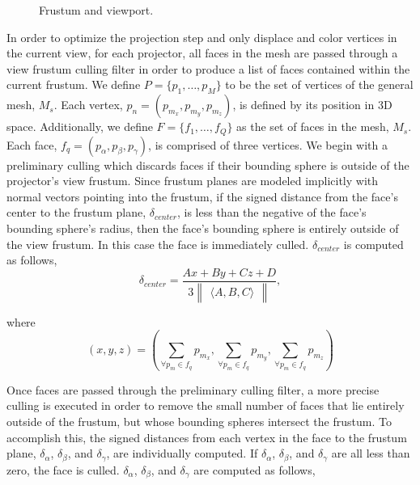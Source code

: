 \documentclass[a4paper,twoside]{article}
\begin{document}
\begin{figure}[!h]
   \vspace{-0.2cm}
   \caption{Frustum and viewport.}
  \label{fig:frustum}
 \end{figure}

In order to optimize the projection step and only displace and color vertices in the current view, for each projector, all faces in the mesh are passed through a view frustum culling filter in order to produce a list of faces contained within the current frustum. We define $P = \{p_{1},\dots,p_{M}\}$ to be the set of vertices of the general mesh, $M_s$. Each vertex, $p_{n} =  (p_{m_{x}},p_{m_{y}},p_{m_{z}})$, is defined by its position in 3D space. Additionally, we define $F = \{f_{1},\dots,f_{Q}\}$ as the set of faces in the mesh, $M_s$. Each face, $f_{q} = (p_{\alpha}, p_{\beta}, p_{\gamma})$, is comprised of three vertices. We begin with a preliminary culling which discards faces if their bounding sphere is outside of the projector's view frustum. Since frustum planes are modeled implicitly with normal vectors pointing into the frustum, if the signed distance from the face's center to the frustum plane, $\delta_{center}$, is less than the negative of the face's bounding sphere's radius, then the face's bounding sphere is entirely outside of the view frustum. In this case the face is immediately culled. $\delta_{center}$ is computed as follows,
%
\begin{equation}
\delta_{center} = \frac{Ax + By + Cz + D}{3 \begin{Vmatrix} \langle A, B, C \rangle \end{Vmatrix}},
\end{equation}

where
\begin{equation}
(x, y, z) = \left(\sum\limits_{\forall p_{m} \in f_{q}} p_{m_{x}}, \sum\limits_{\forall p_{m} \in f_{q}} p_{m_{y}}, \sum\limits_{\forall p_{m} \in f_{q}} p_{m_{z}}\right)
\end{equation}

Once faces are passed through the preliminary culling filter, a more precise culling is executed in order to remove the small number of faces that lie entirely outside of the frustum, but whose bounding spheres intersect the frustum.  To accomplish this, the signed distances from each vertex in the face to the frustum plane, $\delta_{\alpha}$, $\delta_{\beta}$, and $\delta_{\gamma}$, are individually computed. If $\delta_{\alpha}$, $\delta_{\beta}$, and $\delta_{\gamma}$ are all less than zero, the face is culled. $\delta_{\alpha}$, $\delta_{\beta}$, and $\delta_{\gamma}$ are computed as follows,
\end{document}
